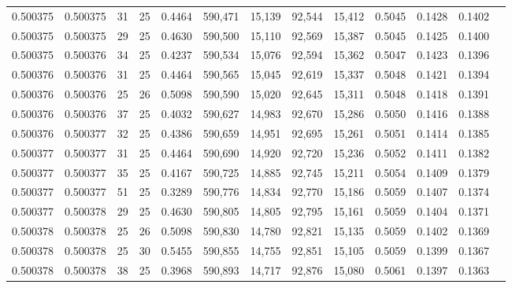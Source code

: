 \begin{tabular}{rrrrrrrrrrrrr}
0.500375 & 0.500375 &    31 &  25 &                                     0.4464 & 590,471 &  15,139 &  92,544 &  15,412 & 0.5045 & 0.1428 & 0.1402 \\
0.500375 & 0.500375 &    29 &  25 &                                     0.4630 & 590,500 &  15,110 &  92,569 &  15,387 & 0.5045 & 0.1425 & 0.1400 \\
0.500375 & 0.500376 &    34 &  25 &                                     0.4237 & 590,534 &  15,076 &  92,594 &  15,362 & 0.5047 & 0.1423 & 0.1396 \\
0.500376 & 0.500376 &    31 &  25 &                                     0.4464 & 590,565 &  15,045 &  92,619 &  15,337 & 0.5048 & 0.1421 & 0.1394 \\
0.500376 & 0.500376 &    25 &  26 &                                     0.5098 & 590,590 &  15,020 &  92,645 &  15,311 & 0.5048 & 0.1418 & 0.1391 \\
0.500376 & 0.500376 &    37 &  25 &                                     0.4032 & 590,627 &  14,983 &  92,670 &  15,286 & 0.5050 & 0.1416 & 0.1388 \\
0.500376 & 0.500377 &    32 &  25 &                                     0.4386 & 590,659 &  14,951 &  92,695 &  15,261 & 0.5051 & 0.1414 & 0.1385 \\
0.500377 & 0.500377 &    31 &  25 &                                     0.4464 & 590,690 &  14,920 &  92,720 &  15,236 & 0.5052 & 0.1411 & 0.1382 \\
0.500377 & 0.500377 &    35 &  25 &                                     0.4167 & 590,725 &  14,885 &  92,745 &  15,211 & 0.5054 & 0.1409 & 0.1379 \\
0.500377 & 0.500377 &    51 &  25 &                                     0.3289 & 590,776 &  14,834 &  92,770 &  15,186 & 0.5059 & 0.1407 & 0.1374 \\
0.500377 & 0.500378 &    29 &  25 &                                     0.4630 & 590,805 &  14,805 &  92,795 &  15,161 & 0.5059 & 0.1404 & 0.1371 \\
0.500378 & 0.500378 &    25 &  26 &                                     0.5098 & 590,830 &  14,780 &  92,821 &  15,135 & 0.5059 & 0.1402 & 0.1369 \\
0.500378 & 0.500378 &    25 &  30 &                                     0.5455 & 590,855 &  14,755 &  92,851 &  15,105 & 0.5059 & 0.1399 & 0.1367 \\
0.500378 & 0.500378 &    38 &  25 &                                     0.3968 & 590,893 &  14,717 &  92,876 &  15,080 & 0.5061 & 0.1397 & 0.1363 \\

\end{tabular}
